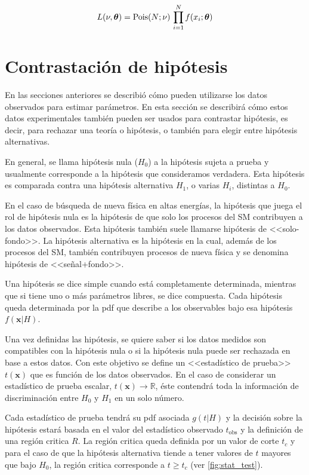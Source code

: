 \begin{equation}
  L(\nu,\bm{\theta}) = \operatorname{Pois}(N;\nu) \, \prod_{i=1}^{N} f(x_i; \bm{\theta})
  \label{eq:likelihood_ext}
\end{equation}


\section{Contrastación de hipótesis}
\label{sec:testhypo}

En las secciones anteriores se describió cómo pueden utilizarse los datos
observados para estimar parámetros. En esta sección se describirá cómo estos
datos experimentales también pueden ser usados para contrastar hipótesis, es
decir, para rechazar una teoría o hipótesis, o también para elegir
entre hipótesis alternativas.

En general, se llama hipótesis nula ($H_0$) a la hipótesis sujeta a prueba y
usualmente corresponde a la hipótesis que consideramos verdadera. Esta hipótesis
es comparada contra una hipótesis alternativa $H_1$, o varias $H_i$, distintas a $H_0$.

En el caso de búsqueda de nueva física en altas energías, la hipótesis que juega el rol de
hipótesis nula es la hipótesis de que solo los procesos del SM contribuyen a los
datos observados. Esta hipótesis también suele llamarse hipótesis de
<<solo-fondo>>. La hipótesis alternativa es la hipótesis en la cual, además
de los procesos del SM, también contribuyen procesos de nueva física y se
denomina hipótesis de <<se\~nal+fondo>>.

Una hipótesis se dice simple cuando está completamente determinada,
mientras que si tiene uno o más parámetros libres, se dice compuesta.
Cada hipótesis queda determinada por la pdf que describe a los observables bajo
esa hipótesis $f(\bm{x}|H)$.

Una vez definidas las hipótesis, se quiere saber si los datos medidos son
compatibles con la hipótesis nula o si la hipótesis nula puede ser rechazada en
base a estos datos. Con este objetivo se define un <<estadístico de prueba>>
$t(\bm{x})$ que es función de los datos observados. En el caso de considerar un
estadístico de prueba escalar, $t(\bm{x}) \to \mathbb{R}$, éste contendrá toda la
información de discriminación entre $H_0$ y $H_1$ en un solo número.

Cada estadístico de prueba tendrá su pdf asociada $g(t|H)$ y la decisión sobre
la hipótesis estará basada en el valor del estadístico observado $t_\text{obs}$
y la definición de una región critica $R$. La región critica queda
definida por un valor de corte $t_c$ y para el caso de que la hipótesis
alternativa tiende a tener valores de $t$ mayores que bajo $H_0$, la región
critica corresponde a $t \geq t_c$ (ver \cref{fig:stat_test}).


